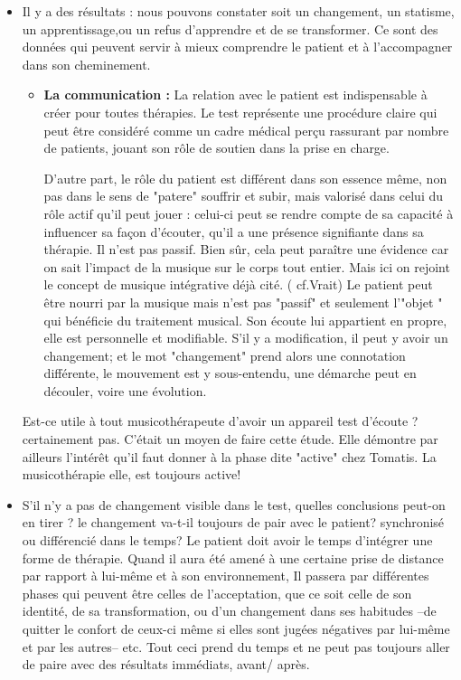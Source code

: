 \begin{itemize}
\item Il y a des résultats : nous pouvons constater soit un changement,
un statisme, un apprentissage,ou un refus d'apprendre et de se transformer.
Ce sont des données qui peuvent servir à mieux comprendre le patient
et à l'accompagner dans son cheminement.
\begin{itemize}
	\item \textbf{La communication : }
	La relation avec le patient est indispensable à créer pour toutes thérapies.
	Le test représente une procédure claire qui peut être considéré comme un cadre médical perçu rassurant par nombre de patients, jouant son rôle de soutien dans la prise en charge.
	
	D'autre part, le rôle du patient est différent dans son essence même, non pas dans le sens de "patere" souffrir et subir, mais valorisé dans celui du rôle actif qu'il peut jouer : celui-ci peut se rendre compte de sa capacité à influencer sa façon d'écouter, qu'il a une présence signifiante dans sa thérapie.  Il n'est pas passif. Bien sûr, cela peut paraître une évidence car on sait l'impact de la musique sur le corps tout entier. Mais ici on rejoint  le concept de musique intégrative déjà cité. ( cf.Vrait) Le patient peut être nourri par la musique mais n'est pas "passif" et seulement l'"objet " qui bénéficie du traitement musical. Son  écoute lui appartient en propre, elle est personnelle et modifiable. S'il y a modification, il peut y avoir un changement; et le mot "changement" prend alors une connotation différente,  le mouvement est y  sous-entendu,  une démarche peut en découler, voire une évolution. 
\end{itemize}


Est-ce utile à tout musicothérapeute d'avoir un appareil test d'écoute ? certainement pas. C'était un moyen de faire cette étude. Elle démontre par ailleurs  l'intérêt qu'il faut donner à la phase dite "active" chez Tomatis. La musicothérapie elle, est toujours active!

\item S'il n'y a pas de changement visible dans le test, quelles conclusions
peut-on en tirer ? le changement va-t-il toujours de pair avec le
patient? synchronisé ou différencié dans le temps?
Le patient doit avoir le temps d'intégrer une forme de thérapie. Quand il aura été amené à une certaine prise de distance par rapport à lui-même et à son environnement, Il passera par différentes phases qui peuvent être celles de l'acceptation, que ce soit celle de son identité, de sa transformation, ou d'un changement dans ses habitudes --de quitter le confort de ceux-ci même si elles sont jugées négatives par lui-même et par les autres-- etc. Tout ceci prend du temps et ne peut pas 
toujours  aller de paire avec des résultats immédiats, avant/ après.



\end{itemize}
